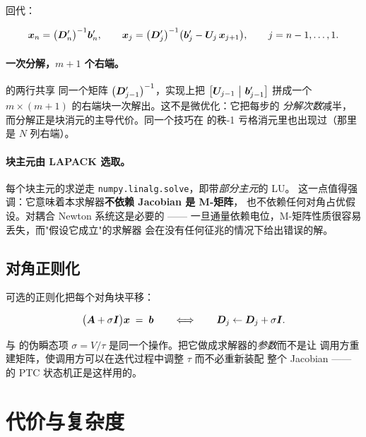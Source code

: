 回代：

\begin{equation}
\bm{x}_n = \bigl(\bm{D}'_n\bigr)^{-1}\bm{b}'_n,
\qquad
\bm{x}_j = \bigl(\bm{D}'_j\bigr)^{-1}\bigl(\bm{b}'_j - \bm{U}_j\,\bm{x}_{j+1}\bigr),
\qquad j=n-1,\dots,1.
\label{eq:block-backward}
\end{equation}

\paragraph{一次分解，$m+1$ 个右端。}  的两行共享
同一个矩阵 $\bigl(\bm{D}'_{j-1}\bigr)^{-1}$，实现上把
$\bigl[\mat{U}_{j-1}\ \big|\ \bm{b}'_{j-1}\bigr]$ 拼成一个
$m\times(m+1)$ 的右端块一次解出。这不是微优化：它把每步的
\emph{分解次数}减半，而分解正是块消元的主导代价。同一个技巧在
 的秩-1 亏格消元里也出现过（那里是 $N$ 列右端）。

\paragraph{块主元由 LAPACK 选取。} 每个块主元的求逆走
\texttt{numpy.linalg.solve}，即带\emph{部分主元}的 LU。
这一点值得强调：它意味着本求解器\textbf{不依赖 Jacobian 是 M-矩阵}，
也不依赖任何对角占优假设。对耦合 Newton 系统这是必要的 ——
一旦通量依赖电位，M-矩阵性质很容易丢失，而"假设它成立"的求解器
会在没有任何征兆的情况下给出错误的解。

\subsection{对角正则化}

可选的正则化把每个对角块平移：

\begin{equation}
\bigl(\bm{A} + \sigma\bm{I}\bigr)\bm{x} \;=\; \bm{b}
\qquad\Longleftrightarrow\qquad
\bm{D}_j \leftarrow \bm{D}_j + \sigma\bm{I}.
\label{eq:block-regularization}
\end{equation}

 与  的伪瞬态项
$\sigma = V/\tau$ 是同一个操作。把它做成求解器的\emph{参数}而不是让
调用方重建矩阵，使调用方可以在迭代过程中调整 $\tau$ 而不必重新装配
整个 Jacobian ——  的 PTC 状态机正是这样用的。

\section{代价与复杂度}
\label{sec:block-cost}

